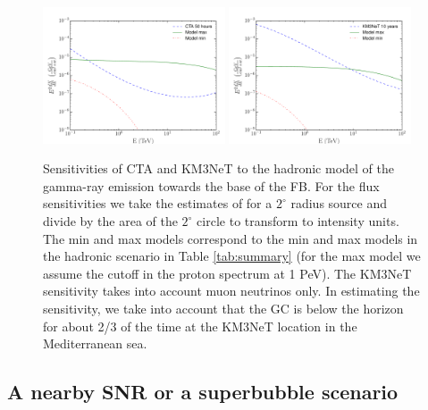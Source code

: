 \begin{figure}[h]
\centering
 \includegraphics[width=0.48\textwidth]{plots/low_lat_FB_CTA.pdf}
 \includegraphics[width=0.48\textwidth]{plots/low_lat_FB_KM3.pdf}
 \caption{Sensitivities of CTA and KM3NeT to the hadronic model of the gamma-ray emission towards the base of the FB.
 For the flux sensitivities we take the estimates of \cite{2018APh...100...69A} for a $2^\circ$ radius source and divide by the
 area of the $2^\circ$ circle to transform to intensity units. The min and max models correspond to the min and max models in
 the hadronic scenario in Table \ref{tab:summary} (for the max model we assume the cutoff in the proton spectrum at 1 PeV).
 The KM3NeT sensitivity takes into account muon neutrinos only.
 In estimating the sensitivity, we take into account that the GC is below the horizon for about 2/3 of the time
 at the KM3NeT location in the Mediterranean sea.
 }
 \label{fig:sensitivities}
\end{figure}


\subsection{A nearby SNR or a superbubble scenario}

